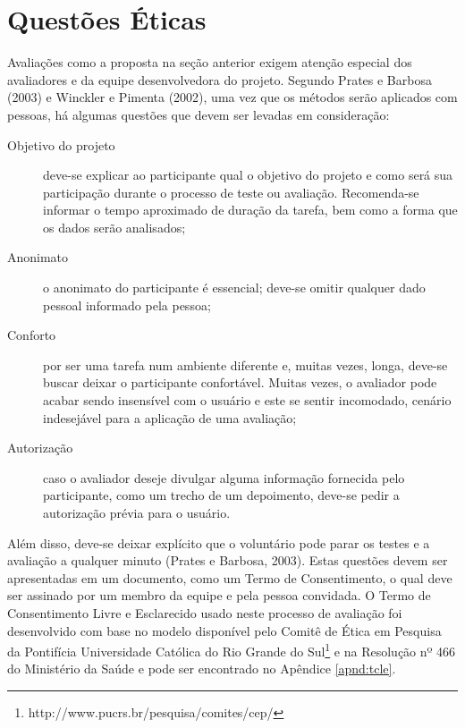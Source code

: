 %

\section{Questões Éticas}

Avaliações como a proposta na seção anterior exigem atenção especial dos avaliadores e da equipe desenvolvedora do projeto. Segundo Prates e Barbosa (2003) e Winckler e Pimenta (2002), uma vez que os métodos serão aplicados com pessoas, há algumas questões que devem ser levadas em consideração:
    \begin{description}
        \item [Objetivo do projeto] deve-se explicar ao participante qual o objetivo do projeto e como será sua participação durante o processo de teste ou avaliação. Recomenda-se informar o tempo aproximado de duração da tarefa, bem como a forma que os dados serão analisados;
        \item [Anonimato] o anonimato do participante é essencial; deve-se omitir qualquer dado pessoal informado pela pessoa;
        \item [Conforto] por ser uma tarefa num ambiente diferente e, muitas vezes, longa, deve-se buscar deixar o participante confortável. Muitas vezes, o avaliador pode acabar sendo insensível com o usuário e este se sentir incomodado, cenário indesejável para a aplicação de uma avaliação;
        \item [Autorização] caso o avaliador deseje divulgar alguma informação fornecida pelo participante, como um trecho de um depoimento, deve-se pedir a autorização prévia para o usuário.
    \end{description}
Além disso, deve-se deixar explícito que o voluntário pode parar os testes e a avaliação a qualquer minuto (Prates e Barbosa, 2003). Estas questões devem ser apresentadas em um documento, como um Termo de Consentimento, o qual deve ser assinado por um membro da equipe e pela pessoa convidada. O Termo de Consentimento Livre e Esclarecido usado neste processo de avaliação foi desenvolvido com base no modelo disponível pelo Comitê de Ética em Pesquisa da Pontifícia Universidade Católica do Rio Grande do Sul\footnote{http://www.pucrs.br/pesquisa/comites/cep/} e na Resolução nº 466 do Ministério da Saúde \cite{MSR466} e pode ser encontrado no Apêndice \ref{apnd:tcle}.
